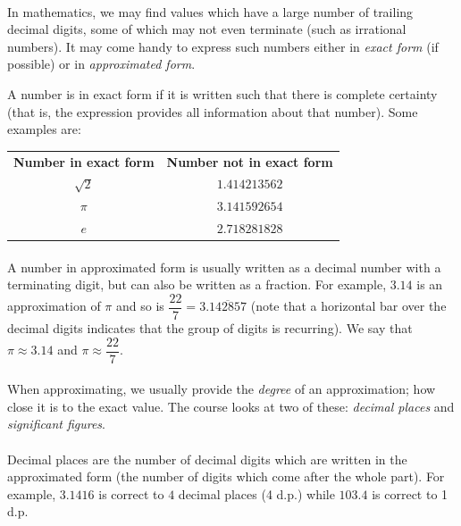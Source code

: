 \documentclass[12pt, a4paper, titlepage, twoside]{article}
\begin{document}
	\paragraph{}
	In mathematics, we may find values which have a large number of trailing decimal digits, some of which may not even terminate
	(such as irrational numbers). It may come handy to express such numbers either in \textit{exact form} (if possible) or in 
	\textit{approximated form}.\\
	
	\begin{kp}
		A number is in exact form if it is written such that there is complete certainty (that is, the expression provides all information
		about that number). Some examples are:
		
		\begin{longtable}{|c|c|}
			\hline
			\textbf{Number in exact form} & \textbf{Number not in exact form}\\
			\hhline{|=|=|}
			$\sqrt{2}$ & $1.414213562$\\
			\hline
			$\pi$ & $3.141592654$\\
			\hline
			$e$ & $2.718281828$\\
			\hline
		\end{longtable}
	\end{kp}
	
	\paragraph{}
	A number in approximated form is usually written as a decimal number with a terminating digit, but can also be written as a fraction.
	For example, $3.14$ is an approximation of $\pi$ and so is $\dfrac{22}{7} = 3.\overline{142857}$ (note that a horizontal bar over the
	decimal digits indicates that the group of digits is recurring). We say that $\pi \approx 3.14$ and $\pi \approx \dfrac{22}{7}$.
	
	\paragraph{}
	When approximating, we usually provide the \textit{degree} of an approximation; how close it is to the exact value. The course looks 
	at two of these: \textit{decimal places} and \textit{significant figures}.
	
	\paragraph{}
	Decimal places are the number of decimal digits which are written in the approximated form (the number of digits which come after
	the whole part). For example, $3.1416$ is correct to $4$ decimal places (4 d.p.) while $103.4$ is correct to 1 d.p.
	
\end{document}

